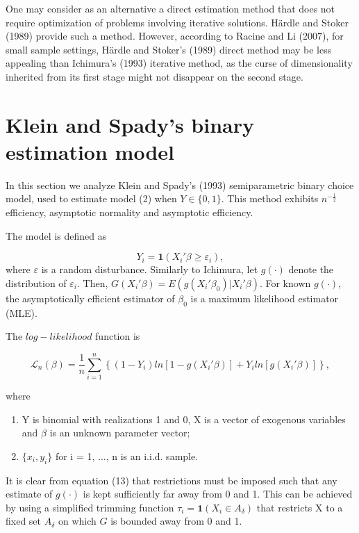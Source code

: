 \documentclass[a4paper]{article}
\begin{document}
One may consider  as an alternative a direct estimation method that does not require optimization of problems involving iterative solutions.  H{\"a}rdle and Stoker (1989) provide such a method. However, according to Racine and Li (2007), for small sample settings, H{\"a}rdle and Stoker's (1989) direct method may be less appealing than Ichimura's (1993) iterative method, as the curse of dimensionality inherited from its first stage might not disappear on the second stage.

\section{Klein and Spady's binary estimation model} %
\label{sec:section_about_references_within_the_document}
In this section we analyze Klein and Spady's (1993) semiparametric binary choice model, used to estimate model (2) when $Y \in \{0,1\}$.   This method exhibits $n^{-\frac{1}{2}}$ efficiency, asymptotic normality and asymptotic efficiency. 

The model is defined as

\begin{equation}
Y_i =  \mathbf{1}{(X_i'\beta \geq \varepsilon_i)},
\end{equation}
where $\varepsilon$ is a random disturbance. Similarly to Ichimura, let $g(\cdot)$ denote the distribution of $\varepsilon_i$. Then, $G(X_i'\beta) = E(g(X_i'\beta_0)|X_i'\beta)$. For known $g(\cdot)$, the asymptotically efficient estimator of $\beta_0$ is a maximum likelihood estimator (MLE). 

The $log-likelihood$ function is

\begin{equation}
\mathcal{L}_n(\beta) = \frac{1}{n}\sum_{i=1}^n \left\{ (1 - Y_i)ln[ 1 - g(X_i'\beta)] + Y_iln[g(X_i'\beta)] \right\},
\end{equation}

where

\begin{enumerate}[label=(\roman*)]
		\item Y is binomial with realizations 1 and 0, X is a vector of exogenous variables and $\beta$ is an unknown parameter vector;
		\item $\{x_i,y_i\}$ for i = 1, ..., n is an i.i.d. sample.
\end{enumerate}

It is clear from equation (13) that restrictions must be imposed such that any estimate of $g(\cdot)$ is kept sufficiently far away from 0 and 1. This can be achieved by using a simplified trimming function $\tau_i = \mathbf{1}{(X_i \in A_\delta)}$ that restricts X to a fixed set $A_\delta$ on which $G$ is bounded away from 0 and 1.
\end{document}
